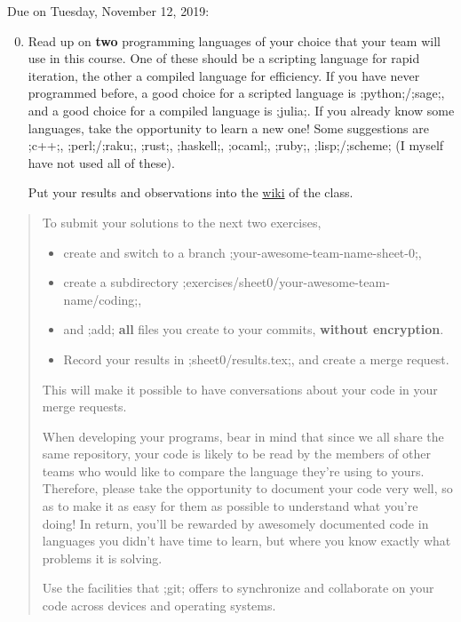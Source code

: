\documentclass[11pt]{amsart}
\newcommand{\alert}[1]{\textbf{\color{red}#1}}
\begin{document}
\bigskip\bigskip
\begin{center}
  \color{blue}Due on Tuesday, November 12, 2019:
\end{center}

\medskip
\begin{enumerate}
  \setcounter{enumi}{-1}
\item
  Read up on \alert{two} programming languages of your choice that your team will use in this course.
  One of these should be a scripting language for rapid iteration, the other a compiled language for efficiency.
  If you have never programmed before, a good choice for a scripted language is ;python;/;sage;, and a good choice for a compiled language is ;julia;.
  If you already know some languages, take the opportunity to learn a new one! Some suggestions are ;c++;, ;perl;/;raku;, ;rust;, ;haskell;, ;ocaml;, ;ruby;, ;lisp;/;scheme;
  (I myself have not used all of these).

  \medskip
  Put your results and observations into the \href{https://gitlab.com/julian-upc/2019-dag-upc/-/wiki_pages/programming-languages}{wiki} of the class.
\end{enumerate}

\bigskip

\begin{quotation}\small
  To submit your solutions to the next two exercises,

  \medskip
  \begin{itemize}[$\quad\triangleright$]
  \item create and switch to a branch ;your-awesome-team-name-sheet-0;,
  \item create a subdirectory ;exercises/sheet0/your-awesome-team-name/coding;,
  \item and ;add; \alert{all} files you create to your commits, \alert{without encryption}.
  \item Record your results in ;sheet0/results.tex;, and create a merge request.
  \end{itemize}

  \medskip
  \noindent This will make it possible to have conversations about your code in your merge requests.

  \medskip
  When developing your programs, bear in mind that since we all share the same repository,
  your code is likely to be read by the members of other teams who would like to compare the language they're using to yours.
  Therefore, please take the opportunity to document your code very well, so as to make it as easy for them as possible to understand what you're doing!
  In return, you'll be rewarded by awesomely documented code in languages you didn't have time to learn, but where you know exactly what problems it is solving.

  \medskip
  Use the facilities that ;git; offers to synchronize and collaborate on your code across devices and operating systems.
\end{quotation}
\end{document}
